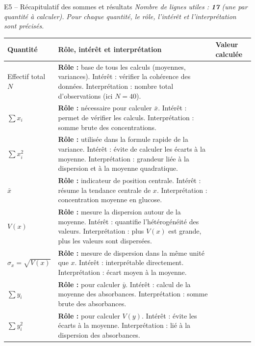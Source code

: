 \documentclass[11pt,a4paper]{article}
\begin{document}
\newpage

\begin{vignetteMethode}{E5 -- Récapitulatif des sommes et résultats}
\emph{Nombre de lignes utiles : \textbf{17} (une par quantité à calculer).}
\emph{Pour chaque quantité, le rôle, l'intérêt et l'interprétation sont précisés.}

\vspace{0.2cm}
\renewcommand{\arraystretch}{1.45}
\begin{center}
\small
\begin{tabular}{|p{3cm}|p{9cm}|p{3cm}|}
\hline
\textbf{Quantité} & \textbf{Rôle, intérêt et interprétation} & \textbf{Valeur calculée} \\ \hline
Effectif total $N$ & 
\tiny\textbf{Rôle : } base de tous les calculs (moyennes, variances). 
Intérêt : vérifier la cohérence des données. 
Interprétation : nombre total d'observations (ici $N=40$). & \\ \hline
$\sum x_i$ & 
\tiny\textbf{Rôle : } nécessaire pour calculer $\bar{x}$. 
Intérêt : permet de vérifier les calculs. 
Interprétation : somme brute des concentrations. & \\ \hline
$\sum x_i^2$ & 
\tiny\textbf{Rôle : } utilisée dans la formule rapide de la variance. 
Intérêt : évite de calculer les écarts à la moyenne. 
Interprétation : grandeur liée à la dispersion et à la moyenne quadratique. & \\ \hline
$\bar{x}$ & 
\tiny\textbf{Rôle : } indicateur de position centrale. 
Intérêt : résume la tendance centrale de $x$. 
Interprétation : concentration moyenne en glucose. & \\ \hline
$V(x)$ & 
\tiny\textbf{Rôle : } mesure la dispersion autour de la moyenne. 
Intérêt : quantifie l'hétérogénéité des valeurs. 
Interprétation : plus $V(x)$ est grande, plus les valeurs sont dispersées. & \\ \hline
$\sigma_x = \sqrt{V(x)}$ & 
\tiny\textbf{Rôle : } mesure de dispersion dans la même unité que $x$. 
Intérêt : interprétable directement. 
Interprétation : écart moyen à la moyenne. & \\ \hline
$\sum y_i$ & 
\tiny\textbf{Rôle : } pour calculer $\bar{y}$. 
Intérêt : calcul de la moyenne des absorbances. 
Interprétation : somme brute des absorbances. & \\ \hline
$\sum y_i^2$ & 
\tiny\textbf{Rôle : } pour calculer $V(y)$. 
Intérêt : évite les écarts à la moyenne. 
Interprétation : lié à la dispersion des absorbances. & \\ \hline

\end{tabular}
\end{center}
\end{vignetteMethode}
\end{document}
